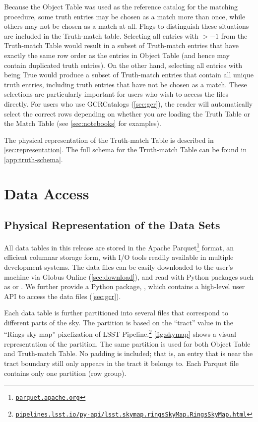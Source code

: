 \documentclass[modern]{descnote}
\newcommand*{\https}[1]{\href{https://#1}{\nolinkurl{#1}}}
\begin{document}
Because the Object Table was used as the reference catalog for the matching procedure, some truth entries may be chosen as a match more than once, while others may not be chosen as a match at all.
Flags to distinguish these situations are included in the Truth-match table. 
Selecting all entries with  $> -1$ from the Truth-match Table would result in a subset of Truth-match entries that have exactly the same row order as the entries in Object Table (and hence may contain duplicated truth entries). On the other hand, selecting all entries with  being True would produce a subset of Truth-match entries that contain all unique truth entries, including truth entries that have not be chosen as a match.
These selections are particularly important for users who wish to access the files directly. For users who use GCRCatalogs (\autoref{sec:gcr}), the reader will automatically select the correct rows depending on whether you are loading the Truth Table or the Match Table (see \autoref{sec:notebooks} for examples).

The physical representation of the Truth-match Table is described in \autoref{sec:representation}. The full schema for the Truth-match Table can be found in \autoref{app:truth-schema}.



\section{Data Access}
\label{sec:access}


\subsection{Physical Representation of the Data Sets}
\label{sec:representation}

All data tables in this release are stored in the Apache Parquet\footnote{\https{parquet.apache.org}} format, an efficient columnar storage form, with I/O tools readily available in multiple development systems. 
The data files can be easily downloaded to the user's machine via Globus Online (\autoref{sec:download}), and read with Python packages such as  or .
We further provide a Python package, , which contains a high-level user API to access the data files (\autoref{sec:gcr}). 

Each data table is further partitioned into several files that correspond to different parts of the sky. The partition is based on the ``tract'' value in the ``Rings sky map'' pixelization of LSST Pipeline.\footnote{\https{pipelines.lsst.io/py-api/lsst.skymap.ringsSkyMap.RingsSkyMap.html}} \autoref{fig:skymap} shows a visual representation of the partition. The same partition is used for both Object Table and Truth-match Table. No padding is included; that is, an entry that is near the tract boundary still only appears in the tract it belongs to. Each Parquet file contains only one partition (row group). 
\end{document}
